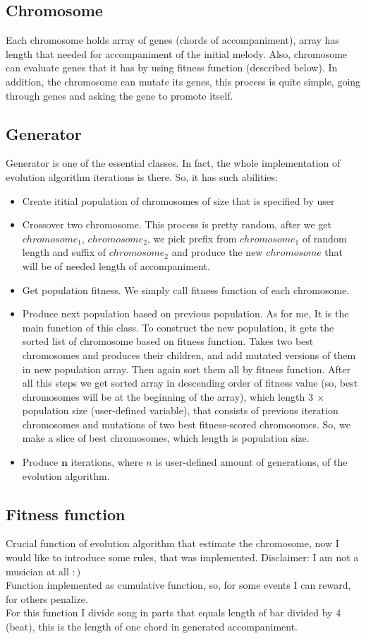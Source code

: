 \documentclass[a4paper]{article}
\begin{document}
\subsection{Chromosome}
Each chromosome holds array of genes (chords of accompaniment), array has length that needed for accompaniment of the initial melody. Also, chromosome can evaluate genes that it has by using fitness function (described below). In addition, the chromosome can mutate its genes, this process is quite simple, going through genes and asking the gene to promote itself.
\subsection{Generator}
Generator is one of the essential classes. In fact, the whole implementation of evolution algorithm iterations is there. So, it has such abilities:

\begin{itemize}
    \item Create ititial population of chromosomes of size that is specified by user
    \item Crossover two chromosome. This process is pretty random, after we get $chromosome_1$, $chromosome_2$, we pick prefix from $chromosome_1$ of random length and suffix of $chromosome_2$ and produce the new $chromosome$ that will be of needed length of accompaniment.
    \item Get population fitness. We simply call fitness function of each chromosome.
    \item Produce next population based on previous population. As for me, It is the main function of this class. To construct the new population, it gets the sorted list of chromosome based on fitness function. Takes two best chromosomes and produces their children, and add mutated versions of them in new population array. Then again sort them all by fitness function. After all this steps we get sorted array in descending order of fitness value (so, best chromosomes will be at the beginning of the array), which length $3 \ \times$ population size (user-defined variable), that consists of previous iteration chromosomes and mutations of two best fitness-scored chromosomes. So, we make a slice of best chromosomes, which length is population size. 
    \item Produce $\textbf{n}$ iterations, where $n$ is user-defined amount of generations, of the evolution algorithm.
\end{itemize}
\subsection{Fitness function}
Crucial function of evolution algorithm that estimate the chromosome, now I would like to introduce some rules, that was implemented. Disclaimer: I am not a musician at all $:)$ \\
Function implemented as cumulative function, so, for some events I can reward, for others penalize. \\
For this function I divide song in parts that equals length of bar divided by 4 (beat), this is the length of one chord in generated accompaniment.
\end{document}
